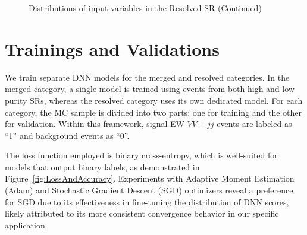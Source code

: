 \begin{figure}[ht]
  \quad
  
  \caption{Distributions of input variables in the Resolved SR (Continued)}
  \label{fig:res_inputs-part2}
\end{figure}


\clearpage
\section{Trainings and Validations}
\label{trainings_and_validations}

We train separate DNN models for the merged and resolved categories. In the merged category, a single model is trained using events from both high and low purity SRs, whereas the resolved category uses its own dedicated model. For each category, the MC sample is divided into two parts: one for training and the other for validation. Within this framework, signal EW $VV+jj$ events are labeled as ``1'' and background events as ``0''.

The loss function employed is binary cross-entropy, which is well-suited for models that output binary labels, as demonstrated in Figure~\ref{fig:LossAndAccuracy}. Experiments with Adaptive Moment Estimation (Adam) and Stochastic Gradient Descent (SGD) optimizers reveal a preference for SGD due to its effectiveness in fine-tuning the distribution of DNN scores, likely attributed to its more consistent convergence behavior in our specific application.


